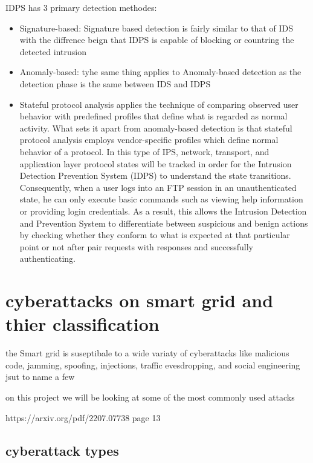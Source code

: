 IDPS has 3 primary detection methodes:


\begin{itemize}
	\item Signature-based: Signature based detection is fairly similar to that of IDS with the diffrence beign that IDPS is capable of blocking or countring the detected intrusion
	\item Anomaly-based: tyhe same thing applies to Anomaly-based detection as the detection phase is the same between IDS and IDPS
	\item Stateful protocol analysis applies the technique of comparing observed user behavior with predefined profiles that define what is regarded as normal activity. What sets it apart from anomaly-based detection is that stateful protocol analysis employs vendor-specific profiles which define normal behavior of a protocol. In this type of IPS, network, transport, and application layer protocol states will be tracked in order for the Intrusion Detection Prevention System (IDPS) to understand the state transitions. Consequently, when a user logs into an FTP session in an unauthenticated state, he can only execute basic commands such as viewing help information or providing login credentials. As a result, this allows the Intrusion Detection and Prevention System to differentiate between suspicious and benign actions by checking whether they conform to what is expected at that particular point or not after pair requests with responses and successfully authenticating. \cite{NIST-IDPS19-20}
	

\end{itemize}









\section{cyberattacks on smart grid and thier classification}
the Smart grid is suseptibale to a wide variaty of cyberattacks like malicious code, jamming, spoofing, injections, traffic evesdropping, and social engineering jsut to name a few

on this project we will be looking at some of the most commonly used attacks

https://arxiv.org/pdf/2207.07738 page 13
\subsection{cyberattack types}
